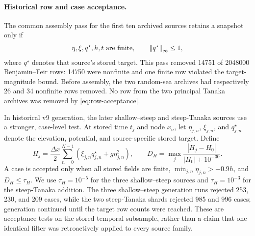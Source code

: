 \paragraph{Historical row and case acceptance.}
The common assembly pass for the first ten archived sources retains a snapshot
only if
\begin{equation}
  \eta,\xi,q^\star,h,t\ \text{are finite},
  \qquad \norm{q^\star}_{\infty}\leq1,
  \label{eq:row-acceptance}
\end{equation}
where $q^\star$ denotes that source's stored target.
This pass removed \num{14751} of \num{2048000} Benjamin--Feir rows:
\num{14750} were nonfinite and one finite row violated the target-magnitude
bound.  Before assembly, the two random-sea archives had respectively 26 and
34 nonfinite rows removed.  No row from the two principal Tanaka archives was
removed by \cref{eq:row-acceptance}.

In historical v9 generation, the later shallow--steep and steep-Tanaka sources
use a stronger, case-level test.  At stored time $t_j$ and node $x_n$, let
$\eta_{j,n}$, $\xi_{j,n}$, and $q^\star_{j,n}$ denote the elevation,
potential, and source-specific stored target.  Define
\begin{equation}
  H_j=\frac{\Delta x}{2}\sum_{n=0}^{N-1}
      \left(\xi_{j,n}q^\star_{j,n}+g\eta_{j,n}^{2}\right),
  \qquad
  D_H=\max_j\frac{|H_j-H_0|}{|H_0|+10^{-30}}.
  \label{eq:data-hamiltonian-drift}
\end{equation}
A case is accepted only when all stored fields are finite,
$\min_{j,n}\eta_{j,n}>-0.9h$, and $D_H\leq\tau_H$.  We use
$\tau_H=10^{-5}$ for the three shallow--steep sources and
$\tau_H=10^{-3}$ for the steep-Tanaka addition.  The three shallow--steep
generation runs rejected 253, 230, and 209 cases, while the two steep-Tanaka
shards rejected 985 and 996 cases; generation continued until the target row
counts were reached.  These are acceptance tests on the stored temporal
subsample, rather than a claim that one identical filter was retroactively
applied to every source family.


